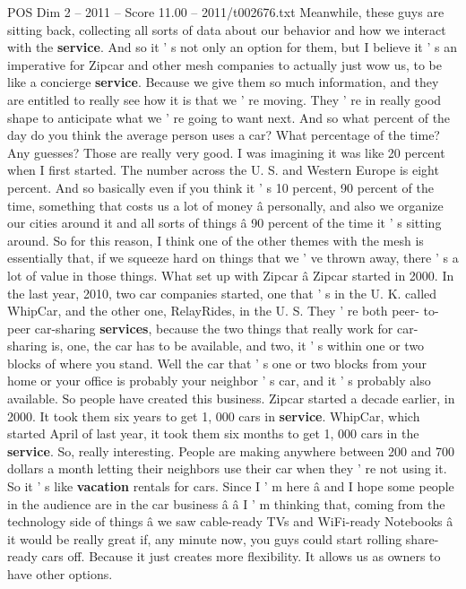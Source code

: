 \begin{textsample}{POS Dim 2 – 2011 – Score 11.00 – 2011/t002676.txt}
Meanwhile, these guys are sitting back, collecting all sorts of data about our behavior and how we interact with the \textbf{service}.
And so it ' s not only an option for them, but I believe it ' s an imperative for Zipcar and other mesh companies to actually just wow us, to be like a concierge \textbf{service}.
Because we give them so much information, and they are entitled to really see how it is that we ' re moving.
They ' re in really good shape to anticipate what we ' re going to want next.
And so what percent of the day do you think the average person uses a car?
What percentage of the time?
Any guesses?
Those are really very good.
I was imagining it was like 20 percent when I first started.
The number across the U.
S. and Western Europe is eight percent.
And so basically even if you think it ' s 10 percent, 90 percent of the time, something that costs us a lot of money â personally, and also we organize our cities around it and all sorts of things â 90 percent of the time it ' s sitting around.
So for this reason, I think one of the other themes with the mesh is essentially that, if we squeeze hard on things that we ' ve thrown away, there ' s a lot of value in those things.
What set up with Zipcar â Zipcar started in 2000.
In the last year, 2010, two car companies started, one that ' s in the U.
K. called WhipCar, and the other one, RelayRides, in the U.
S.
They ' re both peer- to-peer car-sharing \textbf{services}, because the two things that really work for car- sharing is, one, the car has to be available, and two, it ' s within one or two blocks of where you stand.
Well the car that ' s one or two blocks from your home or your office is probably your neighbor ' s car, and it ' s probably also available.
So people have created this business.
Zipcar started a decade earlier, in 2000.
It took them six years to get 1, 000 cars in \textbf{service}.
WhipCar, which started April of last year, it took them six months to get 1, 000 cars in the \textbf{service}.
So, really interesting.
People are making anywhere between 200 and 700 dollars a month letting their neighbors use their car when they ' re not using it.
So it ' s like \textbf{vacation} rentals for cars.
Since I ' m here â and I hope some people in the audience are in the car business â â I ' m thinking that, coming from the technology side of things â we saw cable-ready TVs and WiFi-ready Notebooks â it would be really great if, any minute now, you guys could start rolling share-ready cars off.
Because it just creates more flexibility.
It allows us as owners to have other options.

\end{textsample}
